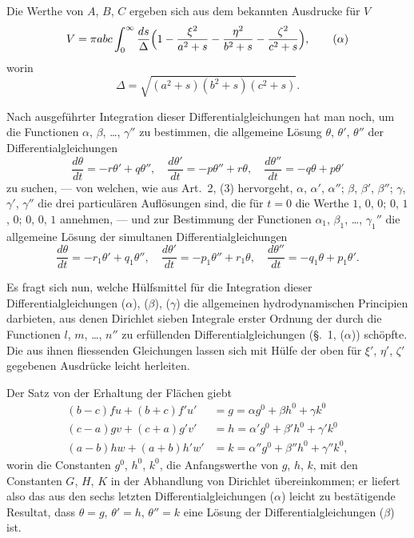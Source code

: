 \documentclass[12pt,a4paper]{book}
\theoremstyle{definition}
\theoremstyle{remark}
\begin{document}
Die Werthe von $A$, $B$, $C$ ergeben sich aus dem bekannten Ausdrucke f\"ur $V$
\begin{equation*}
V = \pi abc\int_{0}^{\infty}\frac{ds}{\Delta}\Bigl(1 - \frac{\xi^{2}}{a^{2} + s} - \frac{\eta^{2}}{b^{2} + s} - \frac{\zeta^{2}}{c^{2} + s}\Bigr),\tag{$\alpha$}
\end{equation*}
worin
\[
\Delta = \sqrt{(a^{2} + s)(b^{2} + s)(c^{2} + s)}.
\]

Nach ausgef\"uhrter Integration dieser Differentialgleichungen hat man noch, um die Functionen $\alpha$, $\beta$, \dots, $\gamma''$ zu bestimmen, die allgemeine L\"osung $\theta$, $\theta'$, $\theta''$ der Differentialgleichungen
\[
\frac{d\theta}{dt} = -r\theta' + q\theta'',\quad \frac{d\theta'}{dt} = -p\theta'' + r\theta,\quad \frac{d\theta''}{dt} = -q\theta + p\theta'\tag{$\beta$}
\]
zu suchen, --- von welchen, wie aus Art.~2, (3) hervorgeht, $\alpha$, $\alpha'$, $\alpha''$; $\beta$, $\beta'$, $\beta''$; $\gamma$, $\gamma'$, $\gamma''$ die drei particul\"aren Aufl\"osungen sind, die f\"ur $t = 0$ die Werthe $1$, $0$, $0$; $0$, $1$, $0$; $0$, $0$, $1$ annehmen, --- und zur Bestimmung der Functionen $\alpha_{1}$, $\beta_{1}$, \dots, $\gamma_{1}''$ die allgemeine L\"osung der simultanen Differentialgleichungen
\[
\frac{d\theta}{dt} = -r_{1}\theta' + q_{1}\theta'',\quad \frac{d\theta'}{dt} = -p_{1}\theta'' + r_{1}\theta,\quad \frac{d\theta''}{dt} = -q_{1}\theta + p_{1}\theta'.\tag{$\gamma$}
\]

Es fragt sich nun, welche H\"ulfsmittel f\"ur die Integration dieser Differentialgleichungen ($\alpha$), ($\beta$), ($\gamma$) die allgemeinen hydrodynamischen Principien darbieten, aus denen Dirichlet sieben Integrale erster Ordnung der durch die Functionen $l$, $m$, \dots, $n''$ zu erf\"ullenden Differentialgleichungen (\S.~1, ($\alpha$)) sch\"opfte. Die aus ihnen fliessenden Gleichungen lassen sich mit H\"ulfe der oben f\"ur $\xi'$, $\eta'$, $\zeta'$ gegebenen Ausdr\"ucke leicht herleiten.

Der Satz von der Erhaltung der Fl\"achen giebt
\begin{align*}
(b - c)fu + (b + c)f'u' &= g = \alpha g^{0} + \beta h^{0} + \gamma k^{0}\\
(c - a)gv + (c + a)g'v' &= h = \alpha' g^{0} + \beta' h^{0} + \gamma' k^{0}\\
(a - b)hw + (a + b)h'w' &= k = \alpha'' g^{0} + \beta'' h^{0} + \gamma'' k^{0},\tag{1}
\end{align*}
worin die Constanten $g^{0}$, $h^{0}$, $k^{0}$, die Anfangswerthe von $g$, $h$, $k$, mit den Constanten $G$, $H$, $K$ in der Abhandlung von Dirichlet \"ubereinkommen; er liefert also das aus den sechs letzten Differentialgleichungen ($\alpha$) leicht zu best\"atigende Resultat, dass $\theta = g$, $\theta' = h$, $\theta'' = k$ eine L\"osung der Differentialgleichungen ($\beta$) ist.
\end{document}
